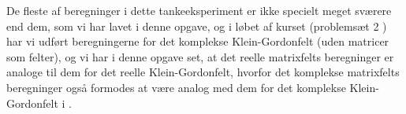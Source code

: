 \documentclass[../main.tex]{subfiles}
\begin{document}
De fleste af beregninger i dette tankeeksperiment er ikke specielt meget sværere end dem, som vi har lavet i denne opgave, og i løbet af kurset (problemsæt 2 \cite{problemSet2}) har vi udført beregningerne for det komplekse Klein-Gordonfelt (uden matricer som felter), og vi har i denne opgave set, at det reelle matrixfelts beregninger er analoge til dem for det reelle Klein-Gordonfelt, hvorfor det komplekse matrixfelts beregninger også formodes at være analog med dem for det komplekse Klein-Gordonfelt i \cite{problemSet2}.


\end{document}
